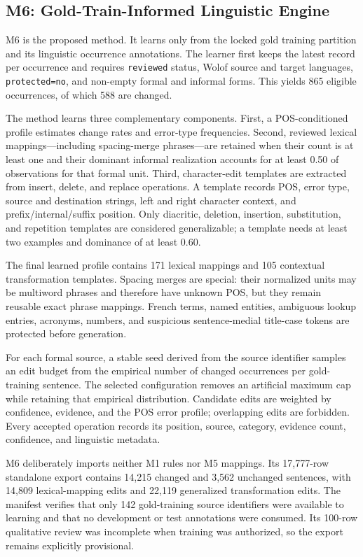 \documentclass[12pt, a4paper, twoside, openany]{report}
\begin{document}
\subsection{M6: Gold-Train-Informed Linguistic Engine}

M6 is the proposed method. It learns only from the locked gold training partition and its linguistic occurrence annotations. The learner first keeps the latest record per occurrence and requires \texttt{reviewed} status, Wolof source and target languages, \texttt{protected=no}, and non-empty formal and informal forms. This yields 865 eligible occurrences, of which 588 are changed.

The method learns three complementary components. First, a POS-conditioned profile estimates change rates and error-type frequencies. Second, reviewed lexical mappings---including spacing-merge phrases---are retained when their count is at least one and their dominant informal realization accounts for at least 0.50 of observations for that formal unit. Third, character-edit templates are extracted from insert, delete, and replace operations. A template records POS, error type, source and destination strings, left and right character context, and prefix/internal/suffix position. Only diacritic, deletion, insertion, substitution, and repetition templates are considered generalizable; a template needs at least two examples and dominance of at least 0.60.

The final learned profile contains 171 lexical mappings and 105 contextual transformation templates. Spacing merges are special: their normalized units may be multiword phrases and therefore have unknown POS, but they remain reusable exact phrase mappings. French terms, named entities, ambiguous lookup entries, acronyms, numbers, and suspicious sentence-medial title-case tokens are protected before generation.

For each formal source, a stable seed derived from the source identifier samples an edit budget from the empirical number of changed occurrences per gold-training sentence. The selected configuration removes an artificial maximum cap while retaining that empirical distribution. Candidate edits are weighted by confidence, evidence, and the POS error profile; overlapping edits are forbidden. Every accepted operation records its position, source, category, evidence count, confidence, and linguistic metadata.

M6 deliberately imports neither M1 rules nor M5 mappings. Its 17,777-row standalone export contains 14,215 changed and 3,562 unchanged sentences, with 14,809 lexical-mapping edits and 22,119 generalized transformation edits. The manifest verifies that only 142 gold-training source identifiers were available to learning and that no development or test annotations were consumed. Its 100-row qualitative review was incomplete when training was authorized, so the export remains explicitly provisional.
\end{document}
